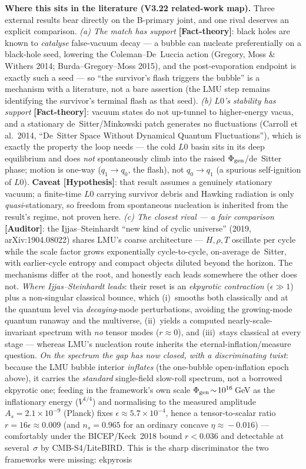 \documentclass[11pt]{article}
\newcommand{\Hyp}{\textbf{\textcolor{blue!55!black}{[Hypothesis]}}}
\newcommand{\Auditor}{\textbf{\textcolor{teal!55!black}{[Auditor]}}}
\newcommand{\factth}{\textcolor{green!40!black}{\textbf{[Fact-theory]}}}
\begin{document}
\medskip\noindent\textbf{Where this sits in the literature (V3.22 related-work map).} Three external results bear directly on the B-primary joint, and one rival deserves an explicit comparison. \emph{(a) The match has support} \factth: black holes are known to \emph{catalyse} false-vacuum decay --- a bubble can nucleate preferentially on a black-hole seed, lowering the Coleman--De~Luccia action (Gregory, Moss \& Withers 2014; Burda--Gregory--Moss 2015), and the post-evaporation endpoint is exactly such a seed --- so ``the survivor's flash triggers the bubble'' is a mechanism with a literature, not a bare assertion (the LMU step remains identifying the survivor's terminal flash as that seed). \emph{(b) $L0$'s stability has support} \factth: vacuum states do not up-tunnel to higher-energy vacua, and a stationary de~Sitter/Minkowski patch generates no fluctuations (Carroll et al.\ 2014, ``De~Sitter Space Without Dynamical Quantum Fluctuations''), which is exactly the property the loop needs --- the cold $L0$ basin sits in its deep equilibrium and does \emph{not} spontaneously climb into the raised $\Phi_{\rm gen}$/de~Sitter phase; motion is one-way ($q_1\!\to\!q_0$, the flash), not $q_0\!\to\!q_1$ (a spurious self-ignition of $L0$). \textbf{Caveat} \Hyp: that result assumes a genuinely stationary vacuum; a finite-time $L0$ carrying survivor debris and Hawking radiation is only \emph{quasi}-stationary, so freedom from spontaneous nucleation is inherited from the result's regime, not proven here. \emph{(c) The closest rival --- a fair comparison} \Auditor: the Ijjas--Steinhardt ``new kind of cyclic universe'' (2019, arXiv:1904.08022) shares LMU's coarse architecture --- $H,\rho,T$ oscillate per cycle while the scale factor grows exponentially cycle-to-cycle, on-average de~Sitter, with earlier-cycle entropy and compact objects diluted beyond the horizon. The mechanisms differ at the root, and honestly each leads somewhere the other does not. \emph{Where Ijjas--Steinhardt leads}: their reset is an \emph{ekpyrotic contraction} ($\epsilon\!\gg\!1$) plus a non-singular classical bounce, which (i)~smooths both classically and at the quantum level via \emph{decaying}-mode perturbations, avoiding the growing-mode quantum runaway and the multiverse, (ii)~yields a computed nearly-scale-invariant spectrum with \emph{no} tensor modes ($r\!\approx\!0$), and (iii)~stays classical at every stage --- whereas LMU's nucleation route inherits the eternal-inflation/measure question. \emph{On the spectrum the gap has now closed, with a discriminating twist}: because the LMU bubble interior \emph{inflates} (the one-bubble open-inflation epoch above), it carries the \emph{standard} single-field slow-roll spectrum, not a borrowed ekpyrotic one; feeding in the framework's own scale $\Phi_{\rm gen}\!\sim\!10^{16}$\,GeV as the inflationary energy ($V^{1/4}$) and normalising to the measured amplitude $A_s\!=\!2.1\times10^{-9}$ (Planck) fixes $\epsilon\!\approx\!5.7\times10^{-4}$, hence a tensor-to-scalar ratio $r\!=\!16\epsilon\!\approx\!0.009$ (and $n_s\!=\!0.965$ for an ordinary concave $\eta\!\approx\!-0.016$) --- comfortably under the BICEP/Keck~2018 bound $r\!<\!0.036$ and detectable at several~$\sigma$ by CMB-S4/LiteBIRD. This is the sharp discriminator the two frameworks were missing: ekpyrosis 
\end{document}

